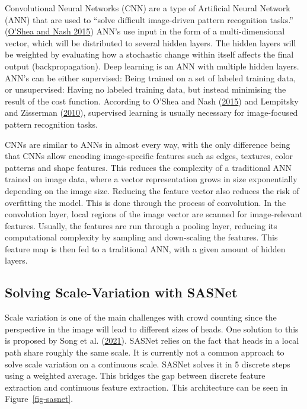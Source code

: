 \documentclass[
]{article}
\begin{document}
Convolutional Neural Networks (CNN) are a type of Artificial Neural
Network (ANN) that are used to ``solve difficult image-driven pattern
recognition tasks.''
(\protect\hyperlink{ref-DBLP:journalsux2fcorrux2fOSheaN15}{O'Shea and
Nash 2015}) ANN's use input in the form of a multi-dimensional vector,
which will be distributed to several hidden layers. The hidden layers
will be weighted by evaluating how a stochastic change within itself
affects the final output (backpropagation). Deep learning is an ANN with
multiple hidden layers. ANN's can be either supervised: Being trained on
a set of labeled training data, or unsupervised: Having no labeled
training data, but instead minimising the result of the cost function.
According to O'Shea and Nash
(\protect\hyperlink{ref-DBLP:journalsux2fcorrux2fOSheaN15}{2015}) and
Lempitsky and Zisserman
(\protect\hyperlink{ref-NIPS2010_fe73f687}{2010}), supervised learning
is usually necessary for image-focused pattern recognition tasks.

CNNs are similar to ANNs in almost every way, with the only difference
being that CNNs allow encoding image-specific features such as edges,
textures, color patterns and shape features. This reduces the complexity
of a traditional ANN trained on image data, where a vector
representation grows in size exponentially depending on the image size.
Reducing the feature vector also reduces the risk of overfitting the
model. This is done through the process of convolution. In the
convolution layer, local regions of the image vector are scanned for
image-relevant features. Usually, the features are run through a pooling
layer, reducing its computational complexity by sampling and
down-scaling the features. This feature map is then fed to a traditional
ANN, with a given amount of hidden layers.

\hypertarget{solving-scale-variation-with-sasnet}{%
\subsection{Solving Scale-Variation with
SASNet}\label{solving-scale-variation-with-sasnet}}

Scale variation is one of the main challenges with crowd counting since
the perspective in the image will lead to different sizes of heads. One
solution to this is proposed by Song et al.
(\protect\hyperlink{ref-sasnet}{2021}). SASNet relies on the fact that
heads in a local path share roughly the same scale. It is currently not
a common approach to solve scale variation on a continuous scale. SASNet
solves it in 5 discrete steps using a weighted average. This bridges the
gap between discrete feature extraction and continuous feature
extraction. This architecture can be seen in Figure~\ref{fig-sasnet}.
\end{document}
